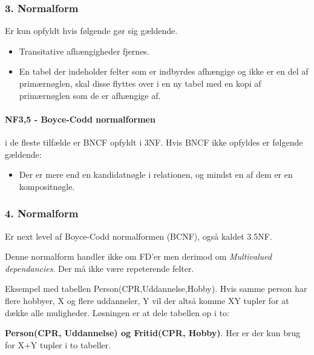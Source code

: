 \subsubsection{3. Normalform} 
Er kun opfyldt hvis følgende gør sig gældende.

\begin{itemize}
	\item Transitative afhængigheder fjernes.
	\item En tabel der indeholder felter som er indbyrdes afhængige og ikke er en del af primærnøglen, skal disse flyttes over i en ny tabel med en kopi af primærnøglen som de er afhængige af.
\end{itemize}
	
\paragraph{NF3,5 - Boyce-Codd normalformen} i de fleste tilfælde er BNCF opfyldt i 3NF. Hvis BNCF ikke opfyldes er følgende gældende:
	
\begin{itemize}
	\item Der er mere end en kandidatnøgle i relationen, og mindst en af dem er en kompositnøgle.
\end{itemize}
	
\subsubsection{4. Normalform}
Er next level af Boyce-Codd normalformen (BCNF), også kaldet 3.5NF.

Denne normalform handler ikke om FD'er men derimod om \textit{Multivalued dependancies}.
Der må ikke være repeterende felter.

Eksempel med tabellen Person(CPR,Uddannelse,Hobby). Hvis samme person har flere hobbyer, X og flere uddanneler, Y vil der altså komme XY tupler for at dække alle muligheder. Løsningen er at dele tabellen op i to: 

\textbf{Person(CPR, Uddannelse) og Fritid(CPR, Hobby)}. Her er der kun brug for X+Y tupler i to tabeller.

